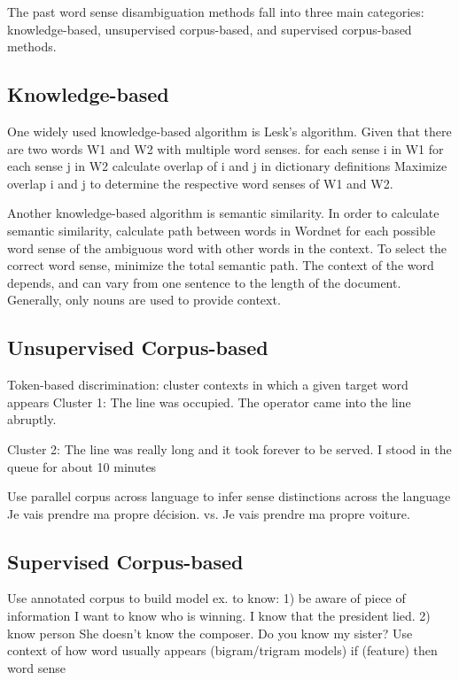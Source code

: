 \documentclass[10pt, letterpaper]{article}
\begin{document}
        The past word sense disambiguation methods fall into three main categories: knowledge-based, unsupervised corpus-based, and supervised corpus-based methods.

	\subsection{Knowledge-based}

        One widely used knowledge-based algorithm is Lesk's algorithm.  Given that there are two words W1 and W2 with multiple word senses.
	for each sense i in W1
	   for each sense j in W2
	      calculate overlap of i and j in dictionary definitions
	Maximize overlap i and j to determine the respective word senses of W1 and W2.
	
        Another knowledge-based algorithm is semantic similarity.  In order to calculate semantic similarity, calculate path between words in Wordnet for each possible word sense of the ambiguous word with other words in the context.  To select the correct word sense, minimize the total semantic path.  The context of the word depends, and can vary from one sentence to the length of the document.  Generally, only nouns are used to provide context. 
	
	\subsection{Unsupervised Corpus-based}
	 Token-based discrimination: cluster contexts in which a given target word appears
	 Cluster 1: The line was occupied. 
	 The operator came into the line abruptly.

	 Cluster 2: The line was really long and it took forever to be served. 
 	 I stood in the queue for about 10 minutes

 	 Use parallel corpus across language to infer sense distinctions across the language
	 Je vais prendre ma propre décision.
	 vs.
	 Je vais prendre ma propre voiture.
	\subsection{Supervised Corpus-based}
	 Use annotated corpus to build model
 	 ex. to know: 1) be aware of piece of information
                              I want to know who is winning.
                              I know that the president lied.
                             2) know person
                             She doesn't know the composer.
                             Do you know my sister?
	 Use context of how word usually appears (bigram/trigram models)
 	 if (feature) then word sense
\end{document}
